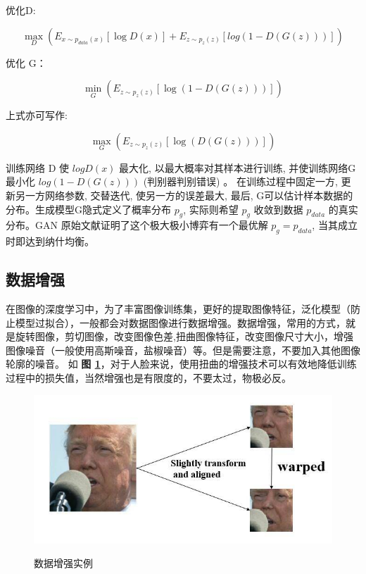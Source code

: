 优化D:

\begin{equation}
\max_D (E_{x \sim p_{data}(x)} [ \log D(x) ] + E_{z \sim p_z(z)} [ log (1 - D(G(z)))])
\end{equation}


优化 G：

\begin{equation}
\min_G (E_{z \sim p_z(z)} [\log (1 - D(G(z)))])
\end{equation}

上式亦可写作:


\begin{equation}
\max_G (E_{z \sim p_z(z)} [ \log (D(G(z)))])
\end{equation}


训练网络 D 使 $log D(x)$ 最大化, 以最大概率对其样本进行训练, 并使训练网络G最小化 $log (1-D (G (z) ) )$ (判别器判别错误) 。
在训练过程中固定一方, 更新另一方网络参数, 交替迭代, 使另一方的误差最大, 最后, G可以估计样本数据的分布。生成模型G隐式定义了概率分布 $p_g$, 实际则希望 $p_g$ 收敛到数据 $p_{data}$ 的真实分布。GAN 原始文献证明了这个极大极小博弈有一个最优解 $p_g = p_{data}$, 当其成立时即达到纳什均衡。

\subsection{数据增强}
在图像的深度学习中，为了丰富图像训练集，更好的提取图像特征，泛化模型（防止模型过拟合），一般都会对数据图像进行数据增强。数据增强，常用的方式，就是旋转图像，剪切图像，改变图像色差,扭曲图像特征，改变图像尺寸大小，增强图像噪音（一般使用高斯噪音，盐椒噪音）等。但是需要注意，不要加入其他图像轮廓的噪音。
如 \textbf{图 \ref{fig:data_aug}}，对于人脸来说，使用扭曲的增强技术可以有效地降低训练过程中的损失值，当然增强也是有限度的，不要太过，物极必反。

\begin{figure}[h!]
	\caption{数据增强实例}
	\centering
	\includegraphics[width=\textwidth]{figure/resources/data_aug.jpg}
	\label{fig:data_aug}
\end{figure}

